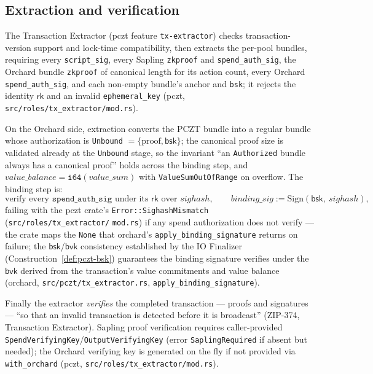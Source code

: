 \documentclass[11pt,a4paper]{article}
\theoremstyle{definition}
\newcommand{\rk}{\mathsf{rk}}
\begin{document}
\subsection{Extraction and verification}\label{sec:pczt-extract}

The Transaction Extractor (\textsf{pczt} feature \texttt{tx-extractor})
checks transaction-version support and lock-time compatibility, then
extracts the per-pool bundles, requiring every \texttt{script\_sig},
every Sapling \texttt{zkproof} and \texttt{spend\_auth\_sig}, the Orchard
bundle \texttt{zkproof} of canonical length for its action count, every
Orchard \texttt{spend\_auth\_sig}, and each non-empty bundle's anchor and
\texttt{bsk}; it rejects the identity $\rk$ and an invalid
\texttt{ephemeral\_key} (\textsf{pczt},
\texttt{src/roles/tx\_extractor/mod.rs}).

On the Orchard side, extraction converts the PCZT bundle into a regular
bundle whose authorization is \texttt{Unbound} $= \{\text{proof},
\mathsf{bsk}\}$; the canonical proof size is validated already at the
\texttt{Unbound} stage, so the invariant ``an \texttt{Authorized} bundle
always has a canonical proof'' holds across the binding step, and
$\mathit{value\_balance} =
\mathtt{i64}(\mathit{value\_sum})$ with \texttt{ValueSumOutOfRange} on
overflow. The binding step is:
\[
\text{verify every } \texttt{spend\_auth\_sig} \text{ under its } \rk
\text{ over } \mathit{sighash}, \qquad
\mathit{binding\_sig} := \mathrm{Sign}(\mathsf{bsk},\ \mathit{sighash}),
\]
failing with the \textsf{pczt} crate's \texttt{Error::SighashMismatch}
(\texttt{src/roles/}\allowbreak\texttt{tx\_extractor/}\allowbreak%
\texttt{mod.rs}) if any spend authorization does not verify --- the crate
maps the \texttt{None} that \textsf{orchard}'s
\texttt{apply\_binding\_signature} returns on failure; the
$\mathsf{bsk}$/$\mathsf{bvk}$
consistency established by the IO Finalizer
(Construction~\ref{def:pczt-bsk}) guarantees the binding signature
verifies under the $\mathsf{bvk}$ derived from the transaction's value
commitments and value balance (\textsf{orchard},
\texttt{src/pczt/tx\_extractor.rs}, \texttt{apply\_binding\_signature}).

Finally the extractor \emph{verifies} the completed transaction ---
proofs and signatures --- ``so that an invalid transaction is detected
before it is broadcast'' (ZIP-374, Transaction Extractor). Sapling proof
verification requires caller-provided
\texttt{SpendVerifyingKey}/\texttt{OutputVerifyingKey} (error
\texttt{SaplingRequired} if absent but needed); the Orchard verifying key
is generated on the fly if not provided via \texttt{with\_orchard}
(\textsf{pczt}, \texttt{src/roles/tx\_extractor/mod.rs}).
\end{document}
